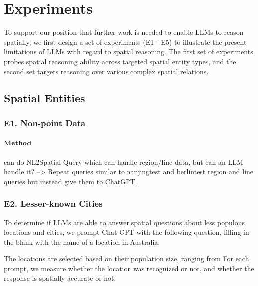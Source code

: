 \section{Experiments}
\label{section:experiments}

To support our position that further work is needed to enable LLMs to reason spatially, we first design a set of experiments (E1 - E5) to illustrate the present limitations of LLMs with regard to spatial reasoning.
The first set of experiments probes spatial reasoning ability across targeted spatial entity types, and the second set targets reasoning over various complex spatial relations.


\subsection{Spatial Entities} %

\subsubsection{E1. Non-point Data}
\paragraph{Method}
\cite{Liu2023} can do NL2Spatial Query which can handle region/line data, but can an LLM handle it?
--> Repeat queries similar to \cite{Liu2023} nanjingtest and berlintest region and line queries but instead give them to ChatGPT.

\subsubsection{E2. Lesser-known Cities}
To determine if LLMs are able to answer spatial questions about less populous locations and cities, we prompt Chat-GPT with the following question, filling in the blank with the name of a location in Australia.

\begin{center}
\end{center}

The locations are selected based on their population size, ranging from 
For each prompt, we measure whether the location was recognized or not, and whether the response is spatially accurate or not.

